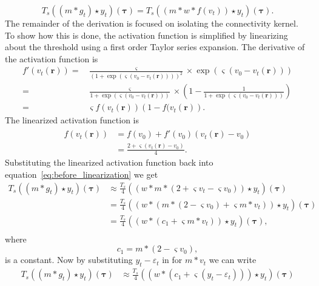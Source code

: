 \documentclass[conference,onecolumn]{IEEEtran}
\begin{document}
\begin{equation}\label{eq:before_linearization}
	T_s((m \ast g_t) \star y_t)(\boldsymbol\tau) = T_s((m \ast w\ast f(v_t)) \star y_t)(\boldsymbol\tau).
\end{equation}
The remainder of the derivation is focused on isolating the connectivity kernel. To show how this is done, the activation function is simplified by linearizing about the threshold using a first order Taylor series expansion. The derivative of the activation function is
\begin{align}
 f'(v_t\left(\mathbf{r}\right))=& \frac{\varsigma}{\left(1 + \exp \left( \varsigma \left( v_0 - v_t\left(\mathbf{r}\right) \right) \right)\right)^2} \times \exp \left( \varsigma \left( v_0 - v_t\left(\mathbf{r}\right) \right) \right) \nonumber \\
=&\frac{\varsigma}{1 + \exp \left( \varsigma \left( v_0 - v_t\left(\mathbf{r}\right) \right) \right)} \times \left(1-\frac{1}{1 + \exp \left( \varsigma \left( v_0 - v_t\left(\mathbf{r}\right) \right) \right)}\right) \nonumber \\
=& \varsigma f(v_t\left(\mathbf{r}\right))\left( 1-f( v_t\left(\mathbf{r}\right)\right).
\end{align}
The linearized activation function is 
\begin{align}
	\hat{f}(v_t\left(\mathbf{r}\right)) &= f(v_0) + f'(v_0)(v_t\left(\mathbf{r}\right) - v_0) \\
	&= \frac{2 + \varsigma(v_t\left(\mathbf{r}\right) - v_0)}{4}. 
\end{align}	
Substituting the linearized activation function back into equation~\ref{eq:before_linearization} we get
\begin{align}	
	T_s((m \ast g_t) \star y_t)(\boldsymbol\tau) &\approx \frac{T_s}{4}(( w \ast m \ast (2 + \varsigma v_t - \varsigma v_0))\star y_t)(\boldsymbol\tau) \\
	&= \frac{T_s}{4}((w \ast (m \ast (2 -\varsigma v_0) + \varsigma m \ast v_t)) \star y_t)(\boldsymbol\tau) \\
&= \frac{T_s}{4}((w\ast (c_1 + \varsigma m \ast v_t)) \star y_t)(\boldsymbol\tau), \\
\end{align}
where
\begin{equation}
	c_1 = m\ast (2 - \varsigma v_0),
\end{equation}
is a constant. Now by substituting $y_t - \varepsilon_t$ in for $m\ast v_t$ we can write
\begin{align}
	T_s((m \ast g_t) \star y_t)(\boldsymbol\tau) &\approx \frac{T_s}{4}((w\ast (c_1 + \varsigma (y_t - \varepsilon_t))) \star y_t) (\boldsymbol\tau)
\end{align}
\end{document}
